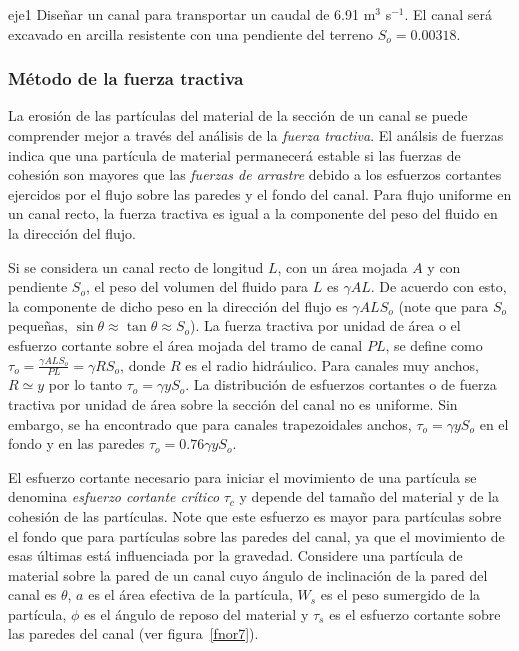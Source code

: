 \documentclass[11pt, oneside]{article}
\begin{document}
\begin{eje}{}{eje1}
Diseñar un canal para transportar un caudal de 6.91 m$^3$ s$^{-1}$. El canal ser\'a excavado en arcilla resistente con una pendiente del terreno $S_o = 0.00318$.
\end{eje}

\subsubsection{M\'etodo de la fuerza tractiva}
La erosión de las part\'iculas del material de la secci\'on de un canal se puede comprender mejor a trav\'es del an\'alisis de la \emph{fuerza tractiva}. El an\'alsis de fuerzas indica que una part\'icula de material permanecer\'a estable si las fuerzas de cohesi\'on son mayores que las \emph{fuerzas de arrastre} debido a los esfuerzos cortantes ejercidos por el flujo sobre las paredes y el fondo del canal. Para flujo uniforme en un canal recto, la fuerza tractiva es igual a la componente del peso del fluido en la direcci\'on del flujo. 

Si se considera un canal recto de longitud $L$, con un \'area mojada $A$ y con pendiente $S_o$, el peso del volumen del fluido para $L$ es $\gamma A L$. De acuerdo con esto, la componente de dicho peso en la direcci\'on del flujo es $\gamma A L S_o$ (note que para $S_o$ pequeñas, $\sin \theta \approx \tan \theta \approx S_o$). La fuerza tractiva por unidad de \'area o el esfuerzo cortante sobre el \'area mojada del tramo de canal $PL$, se define como $\tau_o = \frac{\gamma A L S_o}{PL} = \gamma R S_o$, donde $R$ es el radio hidr\'aulico. Para canales muy anchos, $R \simeq y$ por lo tanto $\tau_o = \gamma y S_o$. La distribuci\'on de esfuerzos cortantes o de fuerza tractiva por unidad de \'area sobre la secci\'on del canal no es uniforme. Sin embargo, se ha encontrado que para canales trapezoidales anchos, $\tau_o = \gamma y S_o$ en el fondo y en las paredes $\tau_o = 0.76 \gamma y S_o$. 

El esfuerzo cortante necesario para iniciar el movimiento de una part\'icula se denomina \emph{esfuerzo cortante cr\'itico} $\tau_c$ y depende del tamaño del material y de la cohesi\'on de las part\'iculas. Note que este esfuerzo es mayor para part\'iculas sobre el fondo que para part\'iculas sobre las paredes del canal, ya que el movimiento de esas \'ultimas est\'a influenciada por la gravedad. Considere una part\'icula de material sobre la pared de un canal cuyo \'angulo de inclinación de la pared del canal es $\theta$, $a$ es el \'area efectiva de la part\'icula, $W_s$ es el peso sumergido de la part\'icula, $\phi$ es el \'angulo de reposo del material  y $\tau_s$ es el esfuerzo cortante sobre las paredes del canal  (ver figura~\ref{fnor7}). 
\end{document}
